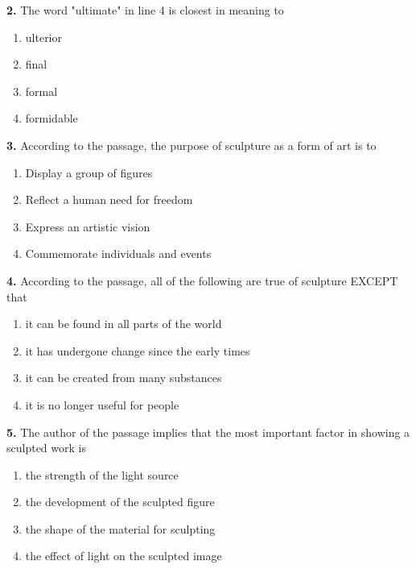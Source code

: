 \documentclass[12pt]{article}
\begin{document}
\noindent\textbf{2.} The word "ultimate" in line 4 is closest in meaning to
\begin{enumerate}[label=(\Alph*),leftmargin=*,itemsep=0.2em]
\item ulterior
\item final
\item formal
\item formidable
\end{enumerate}
\par
\vspace{0.25\baselineskip}
\noindent\textbf{3.} According to the passage, the purpose of sculpture as a form of art is to
\begin{enumerate}[label=(\Alph*),leftmargin=*,itemsep=0.2em]
\item Display a group of figures
\item Reflect a human need for freedom
\item Express an artistic vision
\item Commemorate individuals and events
\end{enumerate}
\par
\vspace{0.25\baselineskip}
\noindent\textbf{4.} According to the passage, all of the following are true of sculpture EXCEPT that
\begin{enumerate}[label=(\Alph*),leftmargin=*,itemsep=0.2em]
\item it can be found in all parts of the world
\item it has undergone change since the early times
\item it can be created from many substances
\item it is no longer useful for people
\end{enumerate}
\par
\vspace{0.25\baselineskip}
\noindent\textbf{5.} The author of the passage implies that the most important factor in showing a sculpted work is
\begin{enumerate}[label=(\Alph*),leftmargin=*,itemsep=0.2em]
\item the strength of the light source
\item the development of the sculpted figure
\item the shape of the material for sculpting
\item the effect of light on the sculpted image
\end{enumerate}
\par
\end{document}
